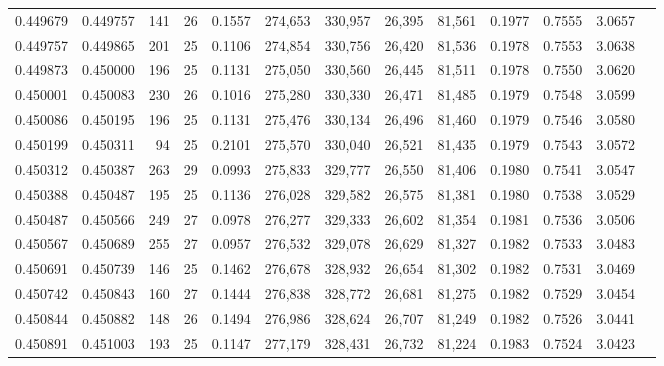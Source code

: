 \begin{tabular}{rrrrrrrrrrrrr}
0.449679 & 0.449757 & 141 &  26 &                                     0.1557 & 274,653 & 330,957 &  26,395 &  81,561 & 0.1977 & 0.7555 & 3.0657 \\
0.449757 & 0.449865 & 201 &  25 &                                     0.1106 & 274,854 & 330,756 &  26,420 &  81,536 & 0.1978 & 0.7553 & 3.0638 \\
0.449873 & 0.450000 & 196 &  25 &                                     0.1131 & 275,050 & 330,560 &  26,445 &  81,511 & 0.1978 & 0.7550 & 3.0620 \\
0.450001 & 0.450083 & 230 &  26 &                                     0.1016 & 275,280 & 330,330 &  26,471 &  81,485 & 0.1979 & 0.7548 & 3.0599 \\
0.450086 & 0.450195 & 196 &  25 &                                     0.1131 & 275,476 & 330,134 &  26,496 &  81,460 & 0.1979 & 0.7546 & 3.0580 \\
0.450199 & 0.450311 &  94 &  25 &                                     0.2101 & 275,570 & 330,040 &  26,521 &  81,435 & 0.1979 & 0.7543 & 3.0572 \\
0.450312 & 0.450387 & 263 &  29 &                                     0.0993 & 275,833 & 329,777 &  26,550 &  81,406 & 0.1980 & 0.7541 & 3.0547 \\
0.450388 & 0.450487 & 195 &  25 &                                     0.1136 & 276,028 & 329,582 &  26,575 &  81,381 & 0.1980 & 0.7538 & 3.0529 \\
0.450487 & 0.450566 & 249 &  27 &                                     0.0978 & 276,277 & 329,333 &  26,602 &  81,354 & 0.1981 & 0.7536 & 3.0506 \\
0.450567 & 0.450689 & 255 &  27 &                                     0.0957 & 276,532 & 329,078 &  26,629 &  81,327 & 0.1982 & 0.7533 & 3.0483 \\
0.450691 & 0.450739 & 146 &  25 &                                     0.1462 & 276,678 & 328,932 &  26,654 &  81,302 & 0.1982 & 0.7531 & 3.0469 \\
0.450742 & 0.450843 & 160 &  27 &                                     0.1444 & 276,838 & 328,772 &  26,681 &  81,275 & 0.1982 & 0.7529 & 3.0454 \\
0.450844 & 0.450882 & 148 &  26 &                                     0.1494 & 276,986 & 328,624 &  26,707 &  81,249 & 0.1982 & 0.7526 & 3.0441 \\
0.450891 & 0.451003 & 193 &  25 &                                     0.1147 & 277,179 & 328,431 &  26,732 &  81,224 & 0.1983 & 0.7524 & 3.0423 \\

\end{tabular}
